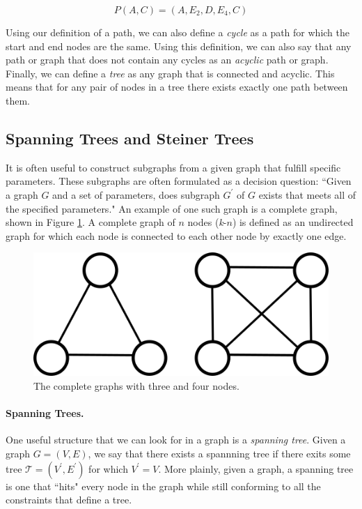\documentclass[12pt,twoside]{reedthesis}
\theoremstyle{definition}
\begin{document}
   \begin{equation*}
     P(A,C) = (A,E_2,D,E_4,C)
   \end{equation*}

   Using our definition of a path, we can also define a \textit{cycle} as a path for which the start and end nodes are the same. Using this definition, we can also say that any path or graph that does not contain any cycles as an \textit{acyclic} path or graph. Finally, we can define a \textit{tree} as any graph that is connected and acyclic. This means that for any pair of nodes in a tree there exists exactly one path between them.\par

   \subsection{Spanning Trees and Steiner Trees}

   It is often useful to construct subgraphs from a given graph that fulfill specific parameters. These subgraphs are often formulated as a decision question: ``Given a graph $G$ and a set of parameters, does subgraph $G^\prime$ of $G$ exists that meets all of the specified parameters." An example of one such graph is a complete graph, shown in Figure \ref{fig:complete_graphs}. A complete graph of $n$ nodes (\textit{k}-$n$) is defined as an undirected graph for which each node is connected to each other node by exactly one edge.

   \begin{figure}[!h]
     \begin{center}
       \includegraphics[width=\textwidth/2]{complete_graphs}
     \caption[Complete Graphs \textit{k}-3 and \textit{k}-4.]{The complete graphs with three and four nodes.}
     \label{fig:complete_graphs}
     \end{center}
   \end{figure}

   \paragraph{Spanning Trees.}One useful structure that we can look for in a graph is a \textit{spanning tree}. Given a graph $G=(V,E)$, we say that there exists a spannning tree if there exits some tree $\mathcal{T}=(V^\prime,E^\prime)$ for which $V^\prime = V$.  More plainly, given a graph, a spanning tree is one that ``hits" every node in the graph while still conforming to all the constraints that define a tree.
\end{document}
